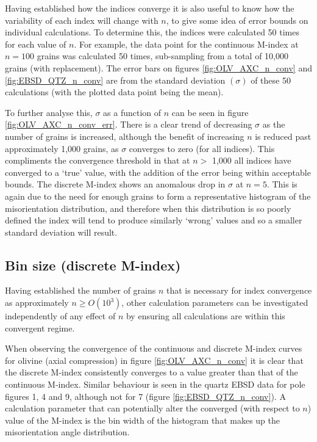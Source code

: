 \documentclass[a4paper,12pt]{report}
\numberwithin{equation}{chapter}
\begin{document}
Having established how the indices converge it is also useful to know how the variability of each index will change with $n$, to give some idea of error bounds on individual calculations. To determine this, the indices were calculated 50 times for each value of $n$. For example, the data point for the continuous M-index at $n = 100$ grains was calculated 50 times, sub-sampling from a total of 10,000 grains (with replacement). The error bars on figures \ref{fig:OLV_AXC_n_conv} and \ref{fig:EBSD_QTZ_n_conv} are from the standard deviation $(\sigma)$ of these 50 calculations (with the plotted data point being the mean).

To further analyse this, $\sigma$ as a function of $n$ can be seen in figure \ref{fig:OLV_AXC_n_conv_err}. There is a clear trend of decreasing $\sigma$ as the number of grains is increased, although the benefit of increasing $n$ is reduced past approximately 1,000 grains, as $\sigma$ converges to zero (for all indices). This compliments the convergence threshold in that at $n >$ 1,000 all indices have converged to a \lq{}true\rq{} value, with the addition of the error being within acceptable bounds. The discrete M-index shows an anomalous drop in $\sigma$ at $n = 5$. This is again due to the need for enough grains to form a representative histogram of the misorientation distribution, and therefore when this distribution is so poorly defined the index will tend to produce similarly \lq{}wrong\rq{} values and so a smaller standard deviation will result.

\subsection{Bin size (discrete M-index)}

Having established the number of grains $n$ that is necessary for index convergence as approximately $n \geq O(10^{3})$, other calculation parameters can be investigated independently of any effect of $n$ by ensuring all calculations are within this convergent regime. 

When observing the convergence of the continuous and discrete M-index curves for olivine (axial compression) in figure \ref{fig:OLV_AXC_n_conv} it is clear that the discrete M-index consistently converges to a value greater than that of the continuous M-index. Similar behaviour is seen in the quartz EBSD data for pole figures 1, 4 and 9, although not for 7 (figure \ref{fig:EBSD_QTZ_n_conv}). A calculation parameter that can potentially alter the converged (with respect to $n$) value of the M-index is the bin width of the histogram that makes up the misorientation angle distribution.   
\end{document}
